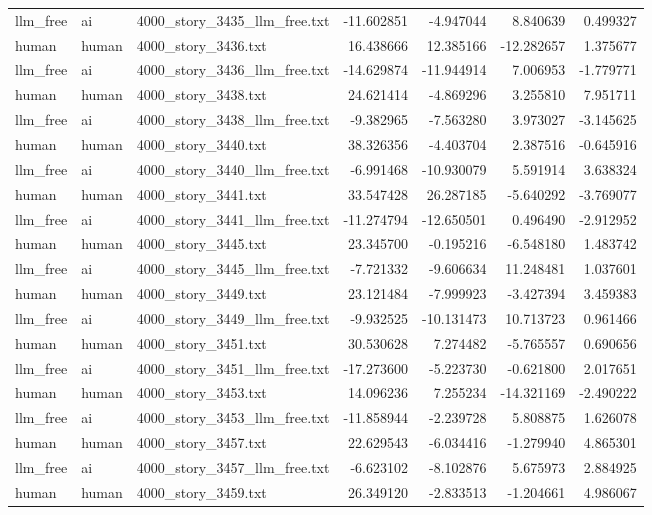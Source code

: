 \begin{longtable}{lllrrrr}
llm\_free & ai & 4000\_story\_3435\_llm\_free.txt & -11.602851 & -4.947044 & 8.840639 & 0.499327 \\
human & human & 4000\_story\_3436.txt & 16.438666 & 12.385166 & -12.282657 & 1.375677 \\
llm\_free & ai & 4000\_story\_3436\_llm\_free.txt & -14.629874 & -11.944914 & 7.006953 & -1.779771 \\
human & human & 4000\_story\_3438.txt & 24.621414 & -4.869296 & 3.255810 & 7.951711 \\
llm\_free & ai & 4000\_story\_3438\_llm\_free.txt & -9.382965 & -7.563280 & 3.973027 & -3.145625 \\
human & human & 4000\_story\_3440.txt & 38.326356 & -4.403704 & 2.387516 & -0.645916 \\
llm\_free & ai & 4000\_story\_3440\_llm\_free.txt & -6.991468 & -10.930079 & 5.591914 & 3.638324 \\
human & human & 4000\_story\_3441.txt & 33.547428 & 26.287185 & -5.640292 & -3.769077 \\
llm\_free & ai & 4000\_story\_3441\_llm\_free.txt & -11.274794 & -12.650501 & 0.496490 & -2.912952 \\
human & human & 4000\_story\_3445.txt & 23.345700 & -0.195216 & -6.548180 & 1.483742 \\
llm\_free & ai & 4000\_story\_3445\_llm\_free.txt & -7.721332 & -9.606634 & 11.248481 & 1.037601 \\
human & human & 4000\_story\_3449.txt & 23.121484 & -7.999923 & -3.427394 & 3.459383 \\
llm\_free & ai & 4000\_story\_3449\_llm\_free.txt & -9.932525 & -10.131473 & 10.713723 & 0.961466 \\
human & human & 4000\_story\_3451.txt & 30.530628 & 7.274482 & -5.765557 & 0.690656 \\
llm\_free & ai & 4000\_story\_3451\_llm\_free.txt & -17.273600 & -5.223730 & -0.621800 & 2.017651 \\
human & human & 4000\_story\_3453.txt & 14.096236 & 7.255234 & -14.321169 & -2.490222 \\
llm\_free & ai & 4000\_story\_3453\_llm\_free.txt & -11.858944 & -2.239728 & 5.808875 & 1.626078 \\
human & human & 4000\_story\_3457.txt & 22.629543 & -6.034416 & -1.279940 & 4.865301 \\
llm\_free & ai & 4000\_story\_3457\_llm\_free.txt & -6.623102 & -8.102876 & 5.675973 & 2.884925 \\
human & human & 4000\_story\_3459.txt & 26.349120 & -2.833513 & -1.204661 & 4.986067 \\

\end{longtable}
